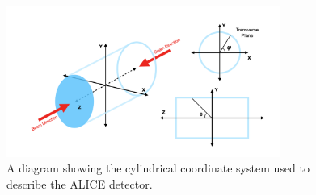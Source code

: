 \begin{figure}
    \centering
    \includegraphics[width=0.8\textwidth]{figures/experiment/detector_coordinates.png}
    \caption{A diagram showing the cylindrical coordinate system used to describe the ALICE detector.}
    \label{fig:detector coordinates}
\end{figure}

